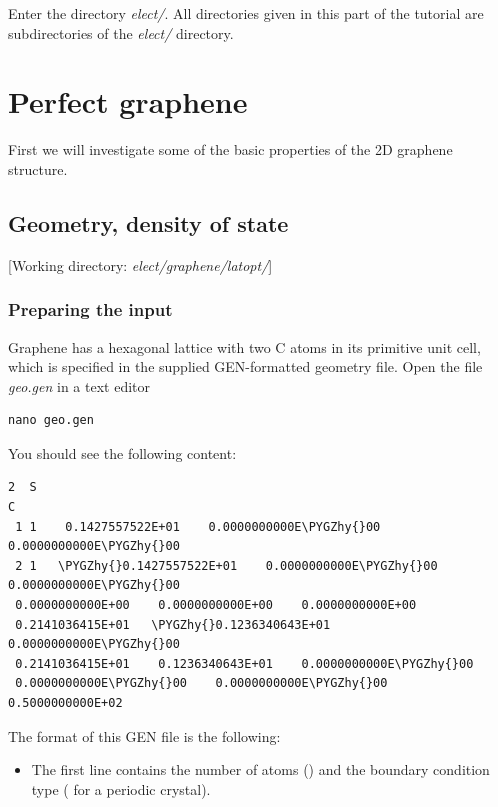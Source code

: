 \documentclass[a4paper,11pt,english]{sphinxmanual}
\def\PYGZhy{\char`\-}
\begin{document}
{{Enter the directory \emph{elect/}. All
directories given in this part of the tutorial are subdirectories of
the \emph{elect/} directory.


\section{Perfect graphene}
\label{electstruct:perfect-graphene}
First we will investigate some of the basic properties of the 2D
graphene structure.


\subsection{Geometry, density of state}
\label{electstruct:geometry-density-of-state}
{[}Working directory: \emph{elect/graphene/latopt/}{]}


\subsubsection{Preparing the input}
\label{electstruct:preparing-the-input}
Graphene has a hexagonal lattice with two C atoms in its primitive
unit cell, which is specified in the supplied GEN-formatted geometry
file. Open the file \emph{geo.gen} in a text editor

\begin{Verbatim}[commandchars=\\\{\}]
nano geo.gen
\end{Verbatim}

You should see the following content:

\begin{Verbatim}[commandchars=\\\{\}]
2  S
C
 1 1    0.1427557522E+01    0.0000000000E\PYGZhy{}00    0.0000000000E\PYGZhy{}00
 2 1   \PYGZhy{}0.1427557522E+01    0.0000000000E\PYGZhy{}00    0.0000000000E\PYGZhy{}00
 0.0000000000E+00    0.0000000000E+00    0.0000000000E+00
 0.2141036415E+01   \PYGZhy{}0.1236340643E+01    0.0000000000E\PYGZhy{}00
 0.2141036415E+01    0.1236340643E+01    0.0000000000E\PYGZhy{}00
 0.0000000000E\PYGZhy{}00    0.0000000000E\PYGZhy{}00    0.5000000000E+02
\end{Verbatim}

The format of this GEN file is the following:
\begin{itemize}
\item {} 
The first line contains the number of atoms () and the boundary
condition type ( for a periodic crystal).


\end{itemize}}}
\end{document}
